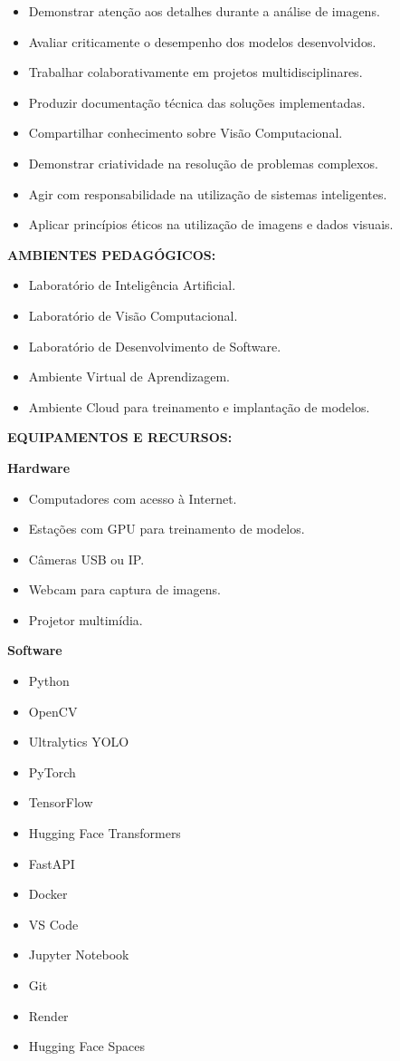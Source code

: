 \begin{itemize}
\item Demonstrar atenção aos detalhes durante a análise de imagens.
\item Avaliar criticamente o desempenho dos modelos desenvolvidos.
\item Trabalhar colaborativamente em projetos multidisciplinares.
\item Produzir documentação técnica das soluções implementadas.
\item Compartilhar conhecimento sobre Visão Computacional.
\item Demonstrar criatividade na resolução de problemas complexos.
\item Agir com responsabilidade na utilização de sistemas inteligentes.
\item Aplicar princípios éticos na utilização de imagens e dados visuais.
\end{itemize}

\textbf{AMBIENTES PEDAGÓGICOS:}

\begin{itemize}
\item Laboratório de Inteligência Artificial.
\item Laboratório de Visão Computacional.
\item Laboratório de Desenvolvimento de Software.
\item Ambiente Virtual de Aprendizagem.
\item Ambiente Cloud para treinamento e implantação de modelos.
\end{itemize}

\textbf{EQUIPAMENTOS E RECURSOS:}

\textbf{Hardware}

\begin{itemize}
\item Computadores com acesso à Internet.
\item Estações com GPU para treinamento de modelos.
\item Câmeras USB ou IP.
\item Webcam para captura de imagens.
\item Projetor multimídia.
\end{itemize}

\textbf{Software}

\begin{itemize}
\item Python
\item OpenCV
\item Ultralytics YOLO
\item PyTorch
\item TensorFlow
\item Hugging Face Transformers
\item FastAPI
\item Docker
\item VS Code
\item Jupyter Notebook
\item Git
\item Render
\item Hugging Face Spaces
\end{itemize}
